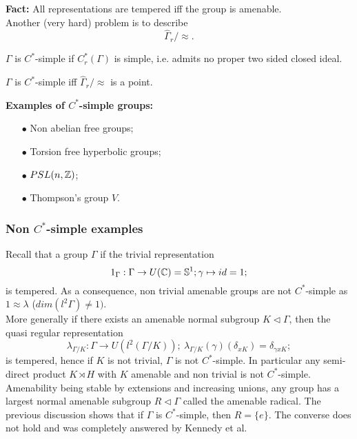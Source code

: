 \textbf{Fact:} All representations are tempered iff the group is amenable.\\

Another (very hard) problem is to describe 
\[\hat \Gamma_r / \approx .\]

\begin{definition}
$\Gamma$ is $C^*$-simple if $C^*_r(\Gamma)$ is simple, i.e. admits no proper two sided closed ideal.
\end{definition}

\begin{thm}[Voiculescu]
$\Gamma$ is $C^*$-simple iff $\hat \Gamma_r / \approx$ is a point.
\end{thm}

\textbf{Examples of $C^*$-simple groups:}
\begin{itemize}
\item[$\bullet$] Non abelian free groups;
\item[$\bullet$] Torsion free hyperbolic groups;
\item[$\bullet$] $PSL(n,\mathbb Z)$;
\item[$\bullet$] Thompson's group $V$.
\end{itemize}

\subsubsection{Non $C^*$-simple examples}

Recall that a group $\Gamma$ if the trivial representation 
\[1_\Gamma : \Gamma \rightarrow U(\mathbb C) = \mathbb S^1; \gamma \mapsto id = 1;\]
is tempered. As a consequence, non trivial amenable groups are not $C^*$-simple as $1 \approx \lambda$ ($dim (l^2\Gamma ) \neq 1 )$.\\

More generally if there exists an amenable normal subgroup $K \vartriangleleft \Gamma$, then the quasi regular representation
\[\lambda_{\Gamma / K} : \Gamma \rightarrow U (l^2(\Gamma / K)); \ \lambda_{\Gamma / K}(\gamma) (\delta_{xK}) = \delta_{\gamma x K}; \]
is tempered, hence if $K$ is not trivial, $\Gamma$ is not $C^*$-simple. In particular any semi-direct product $K \rtimes H$ with $K$ amenable and non trivial is not $C^*$-simple.\\

Amenability being stable by extensions and increasing unions, any group has a largest normal amenable subgroup $R \vartriangleleft \Gamma$ called the amenable radical. The previous discussion shows that if $\Gamma$ is $C^*$-simple, then $R= \{e\}$. The converse does not hold and was completely answered by Kennedy et al.

